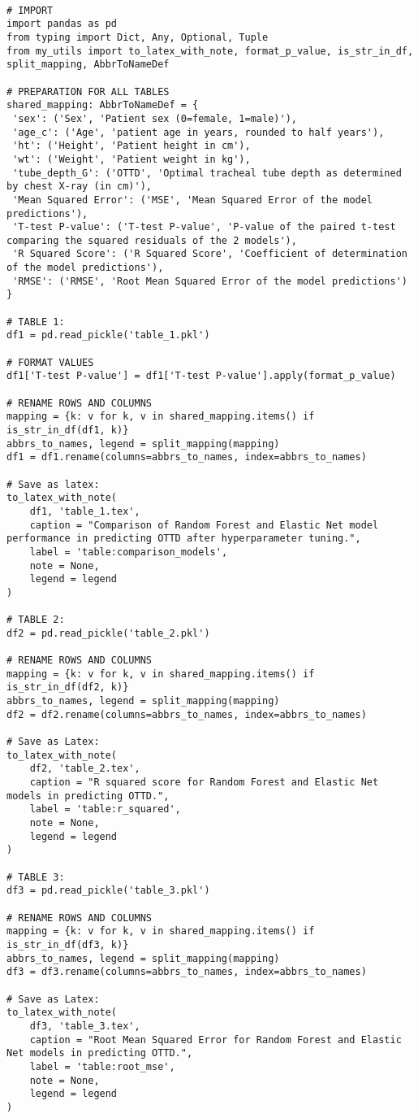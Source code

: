 \documentclass[11pt]{article}
\begin{document}
\begin{verbatim}

# IMPORT
import pandas as pd
from typing import Dict, Any, Optional, Tuple
from my_utils import to_latex_with_note, format_p_value, is_str_in_df, split_mapping, AbbrToNameDef

# PREPARATION FOR ALL TABLES
shared_mapping: AbbrToNameDef = {
 'sex': ('Sex', 'Patient sex (0=female, 1=male)'),
 'age_c': ('Age', 'patient age in years, rounded to half years'),
 'ht': ('Height', 'Patient height in cm'),
 'wt': ('Weight', 'Patient weight in kg'),
 'tube_depth_G': ('OTTD', 'Optimal tracheal tube depth as determined by chest X-ray (in cm)'),
 'Mean Squared Error': ('MSE', 'Mean Squared Error of the model predictions'),
 'T-test P-value': ('T-test P-value', 'P-value of the paired t-test comparing the squared residuals of the 2 models'),
 'R Squared Score': ('R Squared Score', 'Coefficient of determination of the model predictions'),
 'RMSE': ('RMSE', 'Root Mean Squared Error of the model predictions')
}

# TABLE 1:
df1 = pd.read_pickle('table_1.pkl')

# FORMAT VALUES 
df1['T-test P-value'] = df1['T-test P-value'].apply(format_p_value)

# RENAME ROWS AND COLUMNS
mapping = {k: v for k, v in shared_mapping.items() if is_str_in_df(df1, k)}
abbrs_to_names, legend = split_mapping(mapping)
df1 = df1.rename(columns=abbrs_to_names, index=abbrs_to_names)

# Save as latex:
to_latex_with_note(
    df1, 'table_1.tex',
    caption = "Comparison of Random Forest and Elastic Net model performance in predicting OTTD after hyperparameter tuning.",
    label = 'table:comparison_models',
    note = None,
    legend = legend
)

# TABLE 2:
df2 = pd.read_pickle('table_2.pkl')

# RENAME ROWS AND COLUMNS
mapping = {k: v for k, v in shared_mapping.items() if is_str_in_df(df2, k)}
abbrs_to_names, legend = split_mapping(mapping)
df2 = df2.rename(columns=abbrs_to_names, index=abbrs_to_names)

# Save as Latex:
to_latex_with_note(
    df2, 'table_2.tex',
    caption = "R squared score for Random Forest and Elastic Net models in predicting OTTD.",
    label = 'table:r_squared',
    note = None,
    legend = legend
)

# TABLE 3:
df3 = pd.read_pickle('table_3.pkl')

# RENAME ROWS AND COLUMNS
mapping = {k: v for k, v in shared_mapping.items() if is_str_in_df(df3, k)}
abbrs_to_names, legend = split_mapping(mapping)
df3 = df3.rename(columns=abbrs_to_names, index=abbrs_to_names)

# Save as Latex:
to_latex_with_note(
    df3, 'table_3.tex',
    caption = "Root Mean Squared Error for Random Forest and Elastic Net models in predicting OTTD.",
    label = 'table:root_mse',
    note = None,
    legend = legend
)

\end{verbatim}
\end{document}
